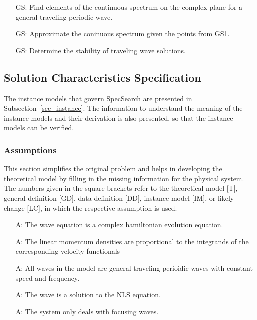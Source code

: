 \documentclass[12pt]{article}
\newcounter{assumpnum} %
\newcounter{goalnum} %
\begin{document}
\begin{itemize}

\item[GS\refstepcounter{goalnum}\thegoalnum \label{G_meaningfulLabel}:] 
Find elements of the continuous spectrum on the complex plane for a general 
traveling periodic wave. 
\item[GS\refstepcounter{goalnum}\thegoalnum \label{G_meaningfulLabel}:] 
Approximate the coninuous spectrum given the points from GS1.
\item[GS\refstepcounter{goalnum}\thegoalnum \label{G_meaningfulLabel}:] 
Determine the stability of traveling wave solutions.

\end{itemize}

\subsection{Solution Characteristics Specification}

The instance models that govern SpecSearch are presented in
Subsection~\ref{sec_instance}.  The information to understand the meaning of the
instance models and their derivation is also presented, so that the instance
models can be verified.

\subsubsection{Assumptions}

This section simplifies the original problem and helps in developing the
theoretical model by filling in the missing information for the physical
system. The numbers given in the square brackets refer to the theoretical model
[T], general definition [GD], data definition [DD], instance model [IM], or
likely change [LC], in which the respective assumption is used.

\begin{itemize}

\item[A\refstepcounter{assumpnum}\theassumpnum \label{A_meaningfulLabel}:]The 
wave equation is a complex hamiltonian  evolution equation. 
\item[A\refstepcounter{assumpnum}\theassumpnum \label{A_meaningfulLabel}:]The 
linear momentum densities are proportional to the integrands of the 
corresponding velocity functionals 
\item[A\refstepcounter{assumpnum}\theassumpnum \label{A_meaningfulLabel}:]All 
waves in the model are general traveling perioidic waves with constant speed 
and frequency. 
\item[A\refstepcounter{assumpnum}\theassumpnum \label{A_meaningfulLabel}:]The 
wave is a solution to the NLS equation.
\item[A\refstepcounter{assumpnum}\theassumpnum \label{A_meaningfulLabel}:]The 
system only deals with focusing waves.

\end{itemize}
\end{document}
